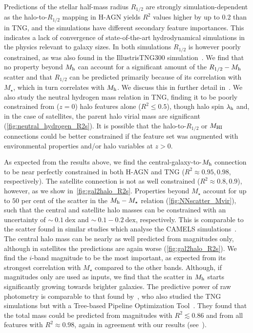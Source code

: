 \documentclass[useAMS,usenatbib]{mnras}
\begin{document}
Predictions of the stellar half-mass radius $R_{1/2}$ are strongly simulation-dependent as the halo-to-$R_{1/2}$ mapping in H-AGN yields $R^2$ values higher by up to $0.2$ than in TNG, and the simulations have different secondary feature importances. This indicates a lack of convergence of state-of-the-art hydrodynamical simulations in the physics relevant to galaxy sizes. In both simulations $R_{1/2}$ is however poorly constrained, as was also found in the IllustrisTNG300 simulation~\citep{de_Santi_2022}. We find that no property beyond $M_{\rm h}$ can account for a significant amount of the $R_{1/2} - M_{\rm h}$ scatter and that $R_{1/2}$ can be predicted primarily because of its correlation with $M_{\star}$, which in turn correlates with $M_{\rm h}$. We discuss this in further detail in~. We also study the neutral hydrogen mass relation in TNG, finding it to be poorly constrained from ($z=0$) halo features alone ($R^2 \leq 0.5$), though halo spin $\lambda_{\rm h}$ and, in the case of satellites, the parent halo virial mass are significant (\cref{fig:neutral_hydrogen_R2s}). It is possible that the halo-to-$R_{1/2}$ or $M_{\rm HI}$ connections could be better constrained if the feature set was augmented with environmental properties and/or halo variables at $z>0$.

As expected from the results above, we find the central-galaxy-to-$M_{\rm h}$ connection to be near perfectly constrained in both H-AGN and TNG ($R^2 \approx 0.95, 0.98$, respectively). The satellite connection is not as well constrained ($R^2 \approx 0.8, 0.9$), however, as we show in~\cref{fig:gal2halo_R2s}. Properties beyond $M_\star$ account for up to $50$ per cent of the scatter in the $M_{\rm h} - M_\star$ relation (\cref{fig:NNscatter_Mvir}), such that the central and satellite halo masses can be constrained with an uncertainty of $\sim~0.1~\mathrm{dex}$ and $\sim~0.1-0.2~\mathrm{dex}$, respectively. This is comparable to the scatter found in similar studies which analyse the CAMELS simulations~\citep{Villanueva_Domingo_2021,Shao_2021}. The central halo mass can be nearly as well predicted from magnitudes only, although in satellites the predictions are again worse (\cref{fig:gal2halo_R2s}). We find the $i$-band magnitude to be the most important, as expected from its strongest correlation with $M_\star$ compared to the other bands. Although, if magnitudes only are used as inputs, we find that the scatter in $M_{\rm h}$ starts significantly growing towards brighter galaxies. The predictive power of raw photometry is comparable to that found by~\cite{vonMarttens_2021}, who also studied the TNG simulations but with a Tree-based Pipeline Optimization Tool~\citep{Olson_2016}. They found that the total mass could be predicted from magnitudes with $R^2 \lesssim0.86$ and from all features with $R^2 \approx 0.98$, again in agreement with our results (see~).
\end{document}
